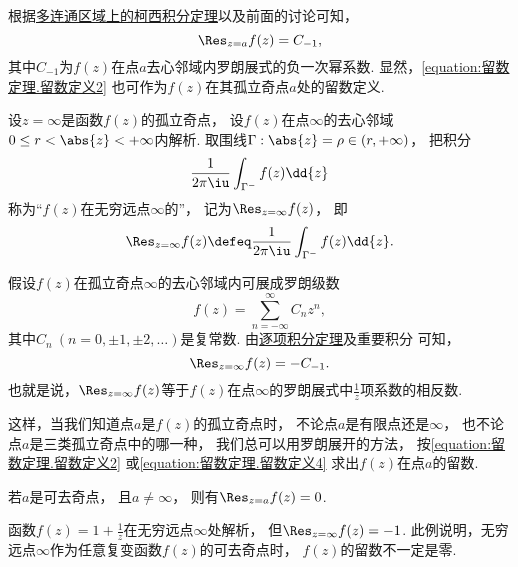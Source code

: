根据\hyperref[theorem:解析函数的积分表示.多连通区域的柯西积分定理]{多连通区域上的柯西积分定理}以及前面的讨论可知，\begin{equation}\label{equation:留数定理.留数定义2}
	\Res_{z=a} f(z) = C_{-1},
\end{equation}
其中\(C_{-1}\)为\(f(z)\)在点\(a\)去心邻域内罗朗展式的负一次幂系数.
显然，\cref{equation:留数定理.留数定义2} 也可作为\(f(z)\)在其孤立奇点\(a\)处的留数定义.

\begin{definition}
设\(z=\infty\)是函数\(f(z)\)的孤立奇点，
设\(f(z)\)在点\(\infty\)的去心邻域\(0 \leq r < \abs{z} < +\infty\)内解析.
取围线\(\Gamma: \abs{z} = \rho\in(r,+\infty)\)，
把积分\begin{equation*}
	\frac{1}{2\pi\iu} \int_{\Gamma^-} f(z) \dd{z}
\end{equation*}称为“\(f(z)\)在无穷远点\(\infty\)的”，
记为\(\Res_{z=\infty} f(z)\)，
即\begin{equation}\label{equation:留数定理.留数定义3}
	\Res_{z=\infty} f(z)
	\defeq
	\frac{1}{2\pi\iu} \int_{\Gamma^-} f(z) \dd{z}.
\end{equation}
\end{definition}

假设\(f(z)\)在孤立奇点\(\infty\)的去心邻域内可展成罗朗级数\begin{equation*}
	f(z) = \sum_{n=-\infty}^\infty C_n z^n,
\end{equation*}
其中\(C_n\ (n=0,\pm1,\pm2,\dotsc)\)是复常数.
由\hyperref[theorem:解析函数的级数表示.一致收敛级数的基本性质2]{逐项积分定理}及重要积分  可知，
\begin{equation}\label{equation:留数定理.留数定义4}
	\Res_{z=\infty} f(z) = - C_{-1}.
\end{equation}
也就是说，\(\Res_{z=\infty} f(z)\)等于\(f(z)\)在点\(\infty\)的罗朗展式中\(\frac{1}{z}\)项系数的相反数.

这样，当我们知道点\(a\)是\(f(z)\)的孤立奇点时，
不论点\(a\)是有限点还是\(\infty\)，
也不论点\(a\)是三类孤立奇点中的哪一种，
我们总可以用罗朗展开的方法，
按\cref{equation:留数定理.留数定义2}
或\cref{equation:留数定理.留数定义4}
求出\(f(z)\)在点\(a\)的留数.

\begin{property}
若\(a\)是可去奇点，
且\(a\neq\infty\)，
则有\(\Res_{z=a} f(z) = 0\).
\end{property}

\begin{example}
函数\(f(z) = 1 + \frac{1}{z}\)在无穷远点\(\infty\)处解析，
但\(\Res_{z=\infty} f(z) = -1\).
此例说明，无穷远点\(\infty\)作为任意复变函数\(f(z)\)的可去奇点时，
\(f(z)\)的留数不一定是零.
\end{example}

